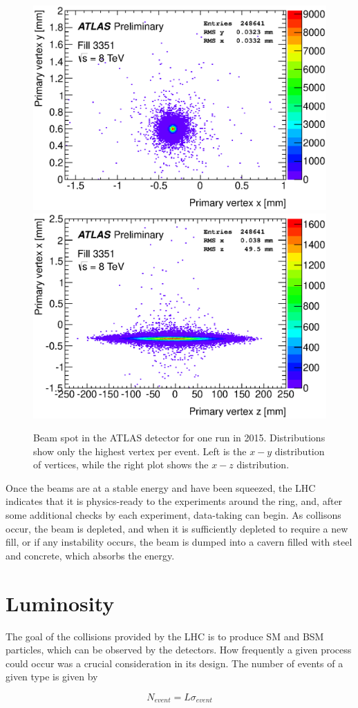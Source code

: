 \begin{centering}
\begin{figure}[!hbt]
\myfloatalign
\includegraphics[width=.45\linewidth]{figures/lhc/beamspot-run215456-vtx-yx.eps}
\includegraphics[width=.45\linewidth]{figures/lhc/beamspot-run215456-vtx-xz.eps}
\caption{Beam spot in the ATLAS detector for one run in 2015. Distributions show only the highest \pt vertex per event. Left is the $x-y$ distribution of vertices, while the right plot shows the $x-z$ distribution.}
\label{fig:beam_spot}
\end{figure}
\end{centering}

Once the beams are at a stable energy and have been squeezed, the \ac{LHC} indicates that it is physics-ready to the experiments around the ring, and, after some additional checks by each experiment, data-taking can begin. As collisons occur, the beam is depleted, and when it is sufficiently depleted to require a new fill, or if any instability occurs, the beam is dumped into a cavern filled with steel and concrete, which absorbs the energy. 

\section{Luminosity}

The goal of the collisions provided by the \ac{LHC} is to produce \ac{SM} and \ac{BSM} particles, which can be observed by the detectors. How frequently a given process could occur was a crucial consideration in its design. The number of events of a given type is given by

\begin{equation}
N_{event} = L\sigma_{event}
\end{equation}

